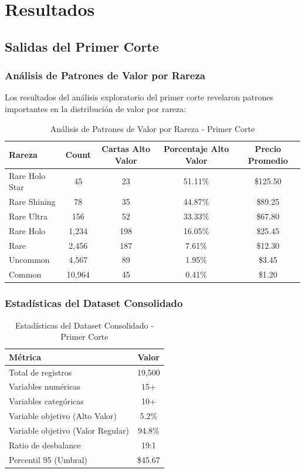 \documentclass[12pt,letterpaper]{article}
\begin{document}
\section{Resultados}

\subsection{Salidas del Primer Corte}

\subsubsection{Análisis de Patrones de Valor por Rareza}

Los resultados del análisis exploratorio del primer corte revelaron patrones importantes en la distribución de valor por rareza:

\begin{table}[H]
\centering
\caption{Análisis de Patrones de Valor por Rareza - Primer Corte}
\begin{tabular}{@{}lcccc@{}}
\toprule
\textbf{Rareza} & \textbf{Count} & \textbf{Cartas Alto Valor} & \textbf{Porcentaje Alto Valor} & \textbf{Precio Promedio} \\
\midrule
Rare Holo Star & 45 & 23 & 51.11\% & \$125.50 \\
Rare Shining & 78 & 35 & 44.87\% & \$89.25 \\
Rare Ultra & 156 & 52 & 33.33\% & \$67.80 \\
Rare Holo & 1,234 & 198 & 16.05\% & \$25.45 \\
Rare & 2,456 & 187 & 7.61\% & \$12.30 \\
Uncommon & 4,567 & 89 & 1.95\% & \$3.45 \\
Common & 10,964 & 45 & 0.41\% & \$1.20 \\
\bottomrule
\end{tabular}
\label{tab:analisis_rareza}
\end{table}

\subsubsection{Estadísticas del Dataset Consolidado}

\begin{table}[H]
\centering
\caption{Estadísticas del Dataset Consolidado - Primer Corte}
\begin{tabular}{@{}lc@{}}
\toprule
\textbf{Métrica} & \textbf{Valor} \\
\midrule
Total de registros & 19,500 \\
Variables numéricas & 15+ \\
Variables categóricas & 10+ \\
Variable objetivo (Alto Valor) & 5.2\% \\
Variable objetivo (Valor Regular) & 94.8\% \\
Ratio de desbalance & 19:1 \\
Percentil 95 (Umbral) & \$45.67 \\
\bottomrule
\end{tabular}
\label{tab:estadisticas_dataset}
\end{table}
\end{document}
